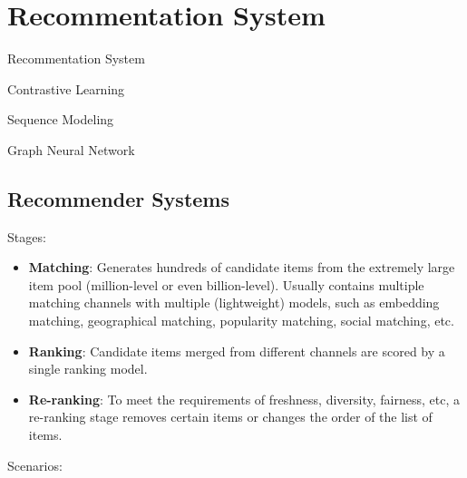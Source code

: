 \chapter{Recommentation System}\label{sec:rs}


\begin{learningobjectives}
	\item Recommentation System
	\item Contrastive Learning
	\item Sequence Modeling
	\item Graph Neural Network
\end{learningobjectives}


\section{Recommender Systems}

Stages:

\begin{itemize}
	\item \textbf{Matching}: Generates hundreds of candidate items from the extremely large item pool (million-level or even billion-level). Usually contains multiple matching channels with multiple (lightweight) models, such as embedding matching, geographical matching, popularity matching, social matching, etc.
	\item \textbf{Ranking}: Candidate items merged from different channels are scored by a single ranking model.
	\item \textbf{Re-ranking}: To meet the requirements of freshness, diversity, fairness, etc, a re-ranking stage removes certain items or changes the order of the list of items.
\end{itemize}

Scenarios:

